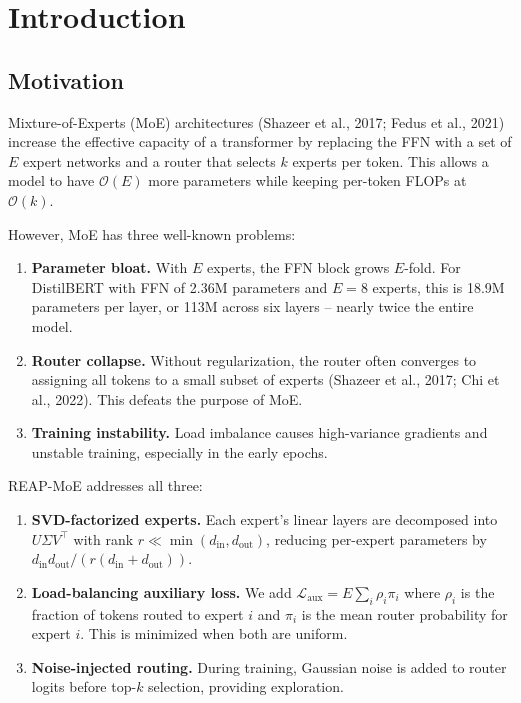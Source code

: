 \section{Introduction}

\subsection{Motivation}

Mixture-of-Experts (MoE) architectures (Shazeer et al., 2017; Fedus et al., 
2021) increase the effective capacity of a transformer by replacing the 
FFN with a set of $E$ expert networks and a router that selects $k$ experts 
per token. This allows a model to have $\mathcal{O}(E)$ more parameters while 
keeping per-token FLOPs at $\mathcal{O}(k)$.

However, MoE has three well-known problems:

\begin{enumerate}
\item \textbf{Parameter bloat.} With $E$ experts, the FFN block grows $E$-fold. For
  DistilBERT with FFN of 2.36M parameters and $E = 8$ experts, this is 18.9M
  parameters per layer, or 113M across six layers -- nearly twice the entire
  model.

\item \textbf{Router collapse.} Without regularization, the router often converges
  to assigning all tokens to a small subset of experts (Shazeer et al., 2017;
  Chi et al., 2022). This defeats the purpose of MoE.

\item \textbf{Training instability.} Load imbalance causes high-variance gradients
  and unstable training, especially in the early epochs.

\end{enumerate}
REAP-MoE addresses all three:

\begin{enumerate}
\item \textbf{SVD-factorized experts.} Each expert's linear layers are decomposed
  into $U \Sigma V^\top$ with rank $r \ll \min(d_\text{in}, d_\text{out})$,
  reducing per-expert parameters by $d_\text{in} d_\text{out} / (r(d_\text{in} + d_\text{out}))$.

\item \textbf{Load-balancing auxiliary loss.} We add $\mathcal{L}_\text{aux} = E \sum_i \rho_i \pi_i$
  where $\rho_i$ is the fraction of tokens routed to expert $i$ and $\pi_i$ is
  the mean router probability for expert $i$. This is minimized when both
  are uniform.

\item \textbf{Noise-injected routing.} During training, Gaussian noise is added to
  router logits before top-$k$ selection, providing exploration.

\end{enumerate}
